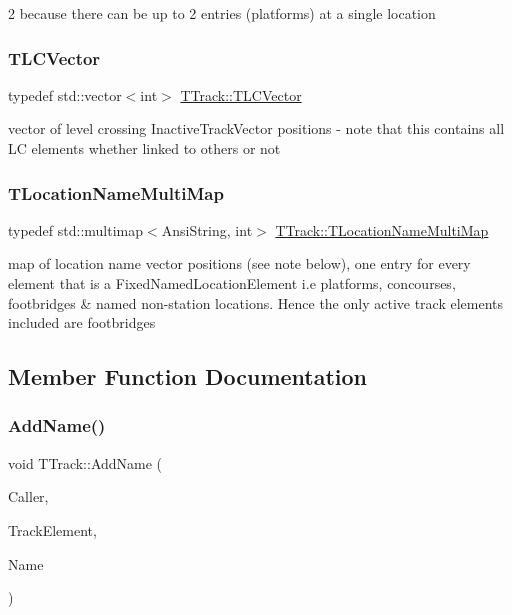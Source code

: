 \textquotesingle{}2\textquotesingle{} because there can be up to 2 entries (platforms) at a single location \mbox{\label{class_t_track_a84634d4f5d5ce1928526e8be27e74a72}} 
\subsubsection{\texorpdfstring{T\+L\+C\+Vector}{TLCVector}}
{\footnotesize\ttfamily typedef std\+::vector$<$int$>$ \mbox{\hyperlink{class_t_track_a84634d4f5d5ce1928526e8be27e74a72}{T\+Track\+::\+T\+L\+C\+Vector}}}

vector of level crossing Inactive\+Track\+Vector positions -\/ note that this contains all LC elements whether linked to others or not \mbox{\label{class_t_track_ac68eed5a26013072d6852aa2e6d6f33d}} 
\subsubsection{\texorpdfstring{T\+Location\+Name\+Multi\+Map}{TLocationNameMultiMap}}
{\footnotesize\ttfamily typedef std\+::multimap$<$Ansi\+String, int$>$ \mbox{\hyperlink{class_t_track_ac68eed5a26013072d6852aa2e6d6f33d}{T\+Track\+::\+T\+Location\+Name\+Multi\+Map}}}

map of location name vector positions (see note below), one entry for every element that is a Fixed\+Named\+Location\+Element i.\+e platforms, concourses, footbridges \& named non-\/station locations. Hence the only active track elements included are footbridges 

\subsection{Member Function Documentation}
\mbox{\label{class_t_track_a306dfdff414c8edf6f974d21bd9b83ce}} 
\subsubsection{\texorpdfstring{Add\+Name()}{AddName()}}
{\footnotesize\ttfamily void T\+Track\+::\+Add\+Name (\begin{DoxyParamCaption}\item[{int}]{Caller,  }\item[{T\+Track\+Vector\+Iterator}]{Track\+Element,  }\item[{Ansi\+String}]{Name }\end{DoxyParamCaption})}

